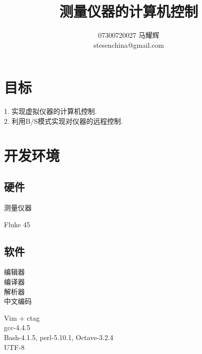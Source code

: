 \documentclass{article}
\title{测量仪器的计算机控制}
\author{07300720027 马耀辉\\[2em]stesenchina@gmail.com}
\begin{document}
\maketitle


\section{目标}
1. 实现虚拟仪器的计算机控制.\\
2. 利用B/S模式实现对仪器的远程控制.\\

\section{开发环境}
\subsection{硬件}
\parbox[t]{4cm}{
测量仪器\\
}
\parbox[t]{12cm}{
Fluke 45\\
}

\subsection{软件}
\parbox[t]{4cm}{
编辑器\\
编译器\\
解析器\\
中文编码\\
}
\parbox[t]{12cm}{
Vim + ctag\\
gcc-4.4.5\\
Bash-4.1.5, perl-5.10.1, Octave-3.2.4\\
UTF-8\\
}
\end{document}
